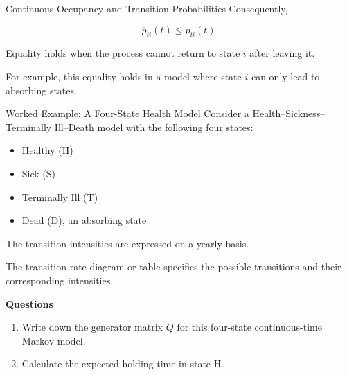 \documentclass[
  ignorenonframetext,
  aspectratio=169,
]{beamer}
\providecommand{\tightlist}{%
  \setlength{\itemsep}{0pt}\setlength{\parskip}{0pt}}
\begin{document}
\begin{frame}{Continuous Occupancy and Transition Probabilities}
\protect{}\label{continuous-occupancy-and-transition-probabilities-1}
Consequently,

\[
\boxed{
\overline p_{ii}(t)\leq p_{ii}(t).
}
\]

Equality holds when the process cannot return to state \(i\) after
leaving it.

For example, this equality holds in a model where state \(i\) can only
lead to absorbing states.
\end{frame}

\begin{frame}{Worked Example: A Four-State Health Model}
\protect{}\label{worked-example-a-four-state-health-model}
Consider a Health--Sickness--Terminally Ill--Death model with the
following four states:

\begin{itemize}
\tightlist
\item
  Healthy (H)
\item
  Sick (S)
\item
  Terminally Ill (T)
\item
  Dead (D), an absorbing state
\end{itemize}

The transition intensities are expressed on a yearly basis.

The transition-rate diagram or table specifies the possible transitions
and their corresponding intensities.

\textbf{Questions}

\begin{enumerate}
\tightlist
\item
  Write down the generator matrix \(Q\) for this four-state
  continuous-time Markov model.
\item
  Calculate the expected holding time in state H.
\end{enumerate}
\end{frame}
\end{document}
